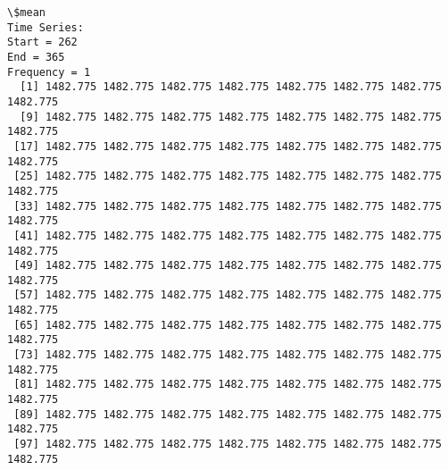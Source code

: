 \documentclass[11pt]{article}
\begin{document}
    \begin{Verbatim}[commandchars=\\\{\}]
\$mean
Time Series:
Start = 262 
End = 365 
Frequency = 1 
  [1] 1482.775 1482.775 1482.775 1482.775 1482.775 1482.775 1482.775 1482.775
  [9] 1482.775 1482.775 1482.775 1482.775 1482.775 1482.775 1482.775 1482.775
 [17] 1482.775 1482.775 1482.775 1482.775 1482.775 1482.775 1482.775 1482.775
 [25] 1482.775 1482.775 1482.775 1482.775 1482.775 1482.775 1482.775 1482.775
 [33] 1482.775 1482.775 1482.775 1482.775 1482.775 1482.775 1482.775 1482.775
 [41] 1482.775 1482.775 1482.775 1482.775 1482.775 1482.775 1482.775 1482.775
 [49] 1482.775 1482.775 1482.775 1482.775 1482.775 1482.775 1482.775 1482.775
 [57] 1482.775 1482.775 1482.775 1482.775 1482.775 1482.775 1482.775 1482.775
 [65] 1482.775 1482.775 1482.775 1482.775 1482.775 1482.775 1482.775 1482.775
 [73] 1482.775 1482.775 1482.775 1482.775 1482.775 1482.775 1482.775 1482.775
 [81] 1482.775 1482.775 1482.775 1482.775 1482.775 1482.775 1482.775 1482.775
 [89] 1482.775 1482.775 1482.775 1482.775 1482.775 1482.775 1482.775 1482.775
 [97] 1482.775 1482.775 1482.775 1482.775 1482.775 1482.775 1482.775 1482.775


\end{Verbatim}
\end{document}
